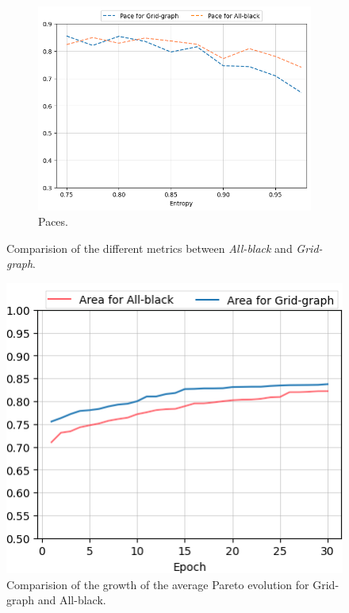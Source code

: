 \begin{figure}[hbtp]
\begin{subfigure}[t]{0.45\linewidth}
	\includegraphics[width=\linewidth]{Images/images/experiment_diff/pace_diff_final.png}
	\caption{Paces.}
	\label{fig:ex_diff_entropy_pace}
	\end{subfigure}

	\caption{Comparision of the different metrics between \textit{All-black} and \textit{Grid-graph}.}
\end{figure}


\begin{figure}[hbtp]
\centering
\includegraphics[width=0.5\linewidth]{Images/images/experiment_diff/pareto_evolution_diff.png}
\caption{Comparision of the growth of the average Pareto evolution for Grid-graph and All-black.}
\label{fig:ex_diff_pareto_evolution}
\end{figure}

